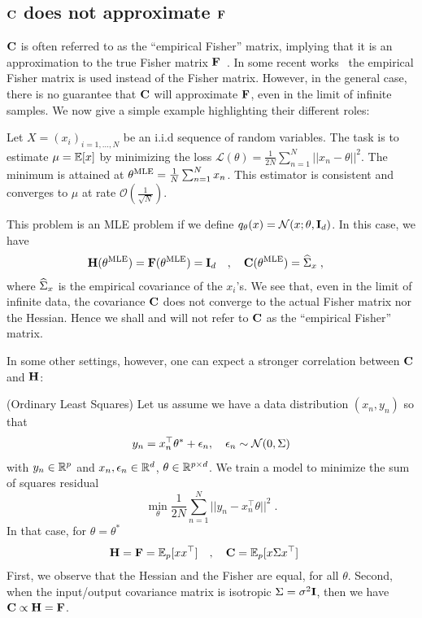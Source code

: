 \subsection{\texorpdfstring{${\mathbf{C}}$}{C} does not approximate \texorpdfstring{${\mathbf{F}}$}{F}}
\label{sec:C_is_not_F}
${\mathbf{C}}$ is often referred to as the ``empirical Fisher'' matrix, implying that it is an approximation to the true Fisher matrix ${\mathbf{F}}$~\citep{martens2014new}. In some recent works~\citep{liang2017fisher, george2018fast} the empirical Fisher matrix is used instead of the Fisher matrix.
However, in the general case, there is no guarantee that ${\mathbf{C}}$ will approximate ${\mathbf{F}}$, even in the limit of infinite samples. We now give a simple example highlighting their different roles:
\begin{example}
Let $X = (x_i)_{i=1, \dots, N}$ be an i.i.d sequence of random variables. The task is to estimate $\mu = \mathbb{E} [x]$ by minimizing the loss $ \mathcal{L}(\theta) = \frac{1}{2 N} \sum_{n=1}^N||x_n - \theta||^2 $. The minimum is attained at $\theta^{\text{MLE}}= \frac{1}{N} \sum_{n=1}^N x_n$. This estimator is consistent and converges to $\mu$ at rate $\mathcal{O}(\tfrac{1}{\sqrt{N}})$.

This problem is an MLE problem if we define $q_\theta(x) = \mathcal{N}(x; \theta, {\mathbf{I}}_d)$. In this case, we have
\begin{align}
\label{eq:HFC}
{\mathbf{H}}(\theta^{\text{MLE}}) = {\mathbf{F}}(\theta^{\text{MLE}}) = {\mathbf{I}}_d\quad &, \quad {\mathbf{C}}(\theta^{\text{MLE}}) = \widehat{{\mathrm{\Sigma}}}_x \; ,
\end{align}
where $\widehat{{\mathrm{\Sigma}}}_x$ is the empirical covariance of the $x_i$'s. We see that, even in the limit of infinite data, the covariance ${\mathbf{C}}$ does not converge to the actual Fisher matrix nor the Hessian. Hence we shall and will not refer to ${\mathbf{C}}$ as the ``empirical Fisher'' matrix.
\end{example}

In some other settings, however, one can expect a stronger correlation between ${\mathbf{C}}$ and ${\mathbf{H}}$:
\begin{example}(Ordinary Least Squares)
Let us assume we have a data distribution $(x_n, y_n)$ so that
\begin{equation}\label{eq:linear_model}
    y_n = x_n^\top \theta^\ast  + \epsilon_n, \quad \epsilon_n \sim \mathcal{N}(0, {\mathrm{\Sigma}})
\end{equation}
with $y_n \in {\mathbb{R}}^p$ and $x_n, \epsilon_n \in {\mathbb{R}}^d$, $\theta \in {\mathbb{R}}^{p \times d}$.
We train a model to minimize the sum of squares residual
\begin{equation}
\min_\theta\frac{1}{2 N} \sum_{n=1}^N || y_n - x_n^\top\theta ||^2 \; .
\end{equation}
In that case, for $\theta = \theta^\ast$
\begin{align}
\label{eq:HFC_OLS}
{\mathbf{H}} = {\mathbf{F}} = \mathbb{E}_p [ x x^\top ] \quad &, \quad {\mathbf{C}} =\mathbb{E}_p [ x {\mathrm{\Sigma}} x^\top ]  \; 
\end{align}
First, we observe that the Hessian and the Fisher are equal, for all $\theta$. Second, when the input/output covariance matrix is isotropic ${\mathrm{\Sigma}}=\sigma^2 {\mathbf{I}}$, then we have ${\mathbf{C}} \propto {\mathbf{H}} = {\mathbf{F}}$. 
\end{example}


